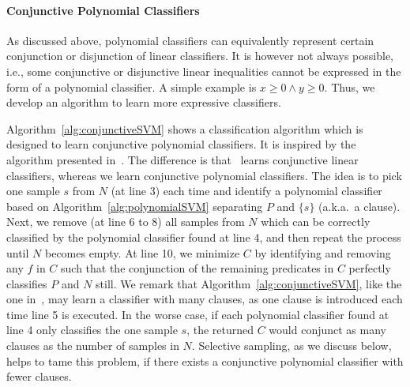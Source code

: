 
\paragraph{Conjunctive Polynomial Classifiers}
As discussed above, polynomial classifiers can equivalently represent certain conjunction or disjunction of linear classifiers. It is however not always possible, i.e., some conjunctive or disjunctive linear inequalities cannot be expressed in the form of a polynomial classifier. A simple example is $\mathit{x \ge 0 \land y \ge 0}$. Thus, we develop an algorithm to learn more expressive classifiers.

Algorithm~\ref{alg:conjunctiveSVM} shows a classification algorithm which is designed to learn conjunctive polynomial classifiers.
It is inspired by the algorithm presented in~\cite{sharma2012interpolants}. The difference is that~\cite{sharma2012interpolants} learns conjunctive linear classifiers, whereas we learn conjunctive polynomial classifiers. The idea is to pick one sample $s$ from $N$ (at line 3) each time and identify a polynomial classifier based on Algorithm~\ref{alg:polynomialSVM} separating $P$ and $\{s\}$ (a.k.a.~a clause). Next, we remove (at line 6 to 8) all samples from $N$ which can be correctly classified by the polynomial classifier found at line 4, and then repeat the process until $N$ becomes empty.
At line 10, we minimize $C$ by identifying and removing any $f$ in $C$ such that the conjunction of the remaining predicates in $C$ perfectly classifies $P$ and $N$ still. We remark that Algorithm~\ref{alg:conjunctiveSVM}, like the one in~\cite{sharma2012interpolants}, may learn a classifier with many clauses, as one clause is introduced each time line 5 is executed. In the worse case, if each polynomial classifier found at line 4 only classifies the one sample $s$, the returned $C$ would conjunct as many clauses as the number of samples in $N$. Selective sampling, as we discuss below, helps to tame this problem, if there exists a conjunctive polynomial classifier with fewer clauses.





